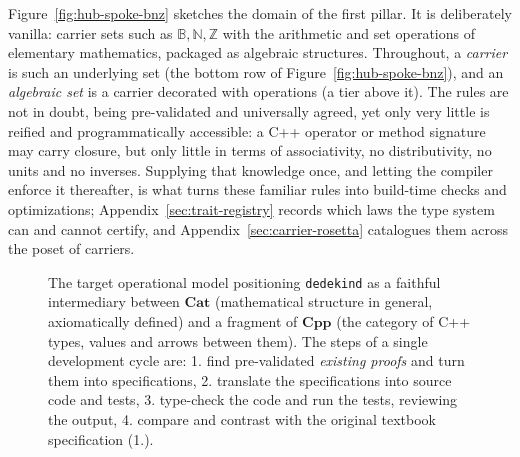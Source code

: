 \documentclass[11pt, a4paper]{article}
\begin{document}
Figure~\ref{fig:hub-spoke-bnz} sketches the domain of the first pillar.
It is deliberately vanilla: carrier sets such as $\mathbb{B}, \mathbb{N}, \mathbb{Z}$ with the arithmetic and set operations of elementary mathematics, packaged as algebraic structures.
Throughout, a \emph{carrier} is such an underlying set (the bottom row of Figure~\ref{fig:hub-spoke-bnz}), and an \emph{algebraic set} is a carrier decorated with operations (a tier above it).
The rules are not in doubt, being pre-validated and universally agreed, yet only very little is reified and programmatically accessible: a C++ operator or method signature may carry closure, but only little in terms of associativity, no distributivity, no units and no inverses.
Supplying that knowledge once, and letting the compiler enforce it thereafter, is what turns these familiar rules into build-time checks and optimizations; Appendix~\ref{sec:trait-registry} records which laws the type system can and cannot certify, and Appendix~\ref{sec:carrier-rosetta} catalogues them across the poset of carriers.

\begin{figure}[htbp]
\centering
{}
\caption{The target operational model positioning  \texttt{dedekind} as a faithful intermediary between $\mathbf{Cat}$ (mathematical structure in general, axiomatically defined) and a fragment of $\mathbf{Cpp}$ (the category of C++ types, values and arrows between them).
The steps of a single development cycle are:
1. find pre-validated \emph{existing proofs} and turn them into specifications,
2. translate the specifications into source code and tests,
3. type-check the code and run the tests, reviewing the output,
4. compare and contrast with the original textbook specification (1.).
}
\label{fig:target_model}
\end{figure}
\end{document}
